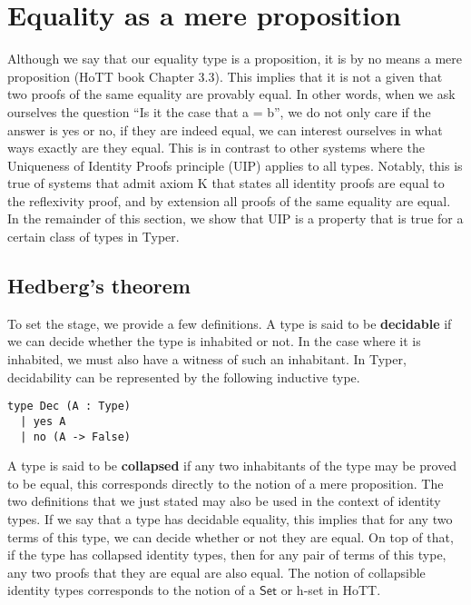 \documentclass[12pt,twoside,maitrise]{dms}
\theoremstyle{definition}
\numberwithin{equation}{section}
\numberwithin{table}{chapter}
\numberwithin{figure}{chapter}
\newcommand\kw[1] {\textsf{#1}}
\begin{document}
\section{Equality as a mere proposition}
Although we say that our equality type is a proposition, it is by no means a
mere proposition (HoTT book\cite{HoTTbook} Chapter 3.3). This implies that it is
not a given that two proofs of the same equality are provably
equal\cite{hofmann1998groupoid}. In other words, when we ask ourselves the
question ``Is it the case that a = b'', we do not only care if the answer is yes
or no, if they are indeed equal, we can interest ourselves in what ways exactly
are they equal. This is in contrast to other systems where the Uniqueness of
Identity Proofs principle (UIP) applies to all types. Notably, this is true of
systems that admit axiom K\cite{streicher1993investigations} that states all
identity proofs are equal to the reflexivity proof, and by extension all proofs
of the same equality are equal. In the remainder of this section, we show that
UIP is a property that is true for a certain class of types in Typer.

\subsection{Hedberg's theorem}\label{subsec:hedberg}

To set the stage, we provide a few definitions. A type is said to be
\textbf{decidable} if we can decide whether the type is inhabited or
not. In the case where it is inhabited, we must also have a witness of such an
inhabitant. In Typer, decidability can be represented by the following inductive
type.

\begin{verbatim}
type Dec (A : Type)
  | yes A
  | no (A -> False)
\end{verbatim}

A type is said to be \textbf{collapsed} if any two inhabitants of the type may
be proved to be equal, this corresponds directly to the notion of a mere
proposition. The two definitions that we just stated may also be used in the
context of identity types. If we say that a type has decidable equality,
this implies that for any two terms of this type, we can decide whether or not
they are equal. On top of that, if the type has collapsed identity types, then
for any pair of terms of this type, any two proofs that they are equal are also
equal. The notion of collapsible identity types corresponds to the notion of a
$\kw{Set}$ or h-set in HoTT.
\end{document}

